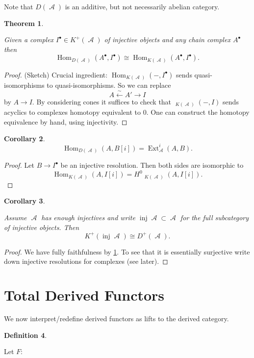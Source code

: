 \documentclass[10pt,]{book}
\theoremstyle{plain}
\newtheorem{theorem}{Theorem}[section]
\newtheorem{corollary}[theorem]{Corollary}
\theoremstyle{definition}
\newtheorem{definition}[theorem]{Definition}
\numberwithin{equation}{section}
\DeclareMathOperator{\Hom}{Hom}
\DeclareMathOperator{\cHom}{\underline{Hom}}
\DeclareMathOperator{\Ext}{Ext}
\DeclareMathOperator{\inj}{inj}
\DeclareMathOperator{\cA}{\mathcal{A}}
\begin{document}
          Note that \(D(\cA)\) is an additive, but not necessarily abelian category.
\begin{theorem}\label{thm-inj-der-hom}

            Given a complex \(I^\bullet \in K^+(\cA)\) of injective objects and any chain complex \(A^\bullet\) then \[\Hom_{D(\cA)}(A^\bullet , I^\bullet) \cong \Hom_{K(\cA)}(A^\bullet, I^\bullet).\]\end{theorem}
\begin{proof}

            (Sketch) Crucial ingredient: \(\Hom_{K(\cA)}(-, I ^\bullet)\) sends quasi-isomorphisms to quasi-isomorphisms.
            So we can replace 
            \[
              A \xleftarrow{\sim} A' \xrightarrow{} I
            \]
            by \(A \to I\).
            By considering cones it suffices to check that \(\cHom_{K(\cA)}(-, I)\) sends acyclics to complexes homotopy equivalent to \(0\).
            One can construct the homotopy equivalence by hand, using injectivity.
          \end{proof}
\begin{corollary}\label{corollary-5}
\[
              \Hom_{D(\cA)}(A,B[i]) = \Ext^i_{\cA}(A,B).
            \]\end{corollary}
\begin{proof}

            Let \(B \to I^\bullet\) be an injective resolution.
            Then both sides are isomorphic to 
            \[
              \Hom_{K(\cA)}(A,I[i]) = H^0 \cHom_{K(\cA)}(A, I[i]).
            \]\end{proof}
\begin{corollary}\label{corollary-6}

            Assume \(\cA\) has enough injectives and write \(\inj \cA \subset \cA\) for the full subcategory of injective objects.
            Then
            \[
              K^+(\inj \cA) \cong D^+(\cA).
            \]\end{corollary}
\begin{proof}

            We have fully faithfulness by \ref{thm-inj-der-hom}.
            To see that it is essentially surjective write down injective resolutions for complexes (see later).
          \end{proof}
\typeout{************************************************}
\typeout{************************************************}
\section[Total Derived Functors]{Total Derived Functors}\label{sec-total-derived}
We now interpret/redefine derived functors as lifts to the derived category.%
\begin{definition}\label{definition-24}

            Let \(F\colon\)\end{definition}
\typeout{************************************************}
\typeout{************************************************}
\end{document}
